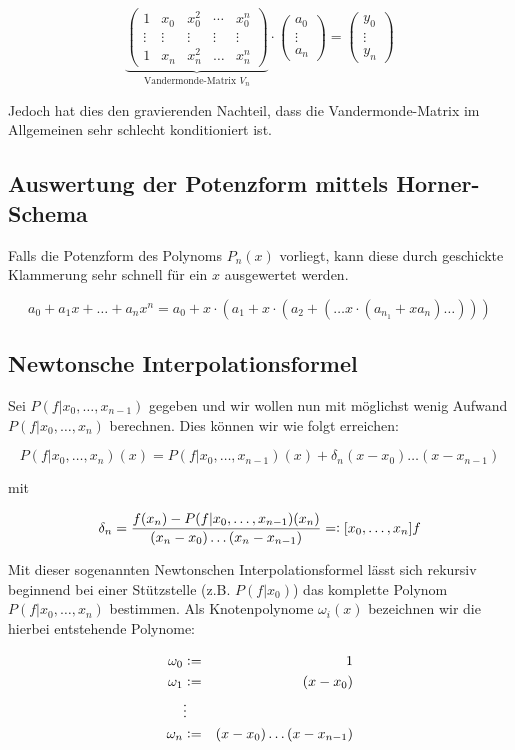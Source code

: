 \documentclass[a4paper,parskip=half*,DIV=7,fontsize=11pt]{scrartcl}
\newcommand{\defeq}{\vcentcolon =}
\newcommand{\eqdef}{=\vcentcolon}
\begin{document}
\[\underbrace{\begin{pmatrix} 1 & x_0 & x_0^2 & \cdots & x_0^n \\ \vdots & \vdots & \vdots & \vdots & \vdots \\ 1 & x_n & x_n^2 & \ldots & x_n^n\end{pmatrix}}_{\text{Vandermonde-Matrix $V_n$}} \cdot \begin{pmatrix} a_0 \\ \vdots \\ a_n \end{pmatrix} = \begin{pmatrix} y_0 \\ \vdots \\ y_n \end{pmatrix}\]

Jedoch hat dies den gravierenden Nachteil, dass die Vandermonde-Matrix im Allgemeinen sehr schlecht konditioniert ist. 

\subsection{Auswertung der Potenzform mittels Horner-Schema}
Falls die Potenzform des Polynoms $P_n (x)$ vorliegt, kann diese durch geschickte Klammerung sehr schnell für ein $x$ ausgewertet werden.

\[a_0 + a_1x + \hdots + a_nx^n = a_0 + x\cdot (a_1 + x\cdot (a_2 + (\hdots  x\cdot (a_{n_1} + xa_n) \hdots) ) )\]

\subsection{Newtonsche Interpolationsformel}
Sei $P(f|x_0,\ldots,x_{n-1})$ gegeben und wir wollen nun mit möglichst wenig Aufwand $P(f|x_0,\ldots,x_n)$ berechnen. Dies können wir wie folgt erreichen:

\[P(f|x_0,\ldots,x_n)(x) = P(f|x_0,\ldots,x_{n-1}) (x) + \delta_n(x-x_0)\ldots (x-x_{n-1})\]

mit

\[\delta_n = \frac{f(x_n) - P(f|x_0,\ldots,x_{n-1})(x_n)}{(x_n -x_0)\ldots (x_n-x_{n-1})} \eqdef [x_0,\ldots,x_n]f\]

Mit dieser sogenannten Newtonschen Interpolationsformel lässt sich rekursiv beginnend bei einer Stützstelle (z.B. $P(f|x_0)$) das komplette Polynom $P(f|x_0,\ldots,x_n)$ bestimmen. Als Knotenpolynome $\omega_i (x)$ bezeichnen wir die hierbei entstehende Polynome:

\begin{eqnarray}
\omega_0 &\defeq& 1 \nonumber \\
\omega_1 &\defeq& (x-x_0) \nonumber \\
&\vdots& \nonumber \\
\omega_n &\defeq& (x-x_0)\ldots (x-x_{n-1}) \nonumber
\end{eqnarray}
\end{document}
